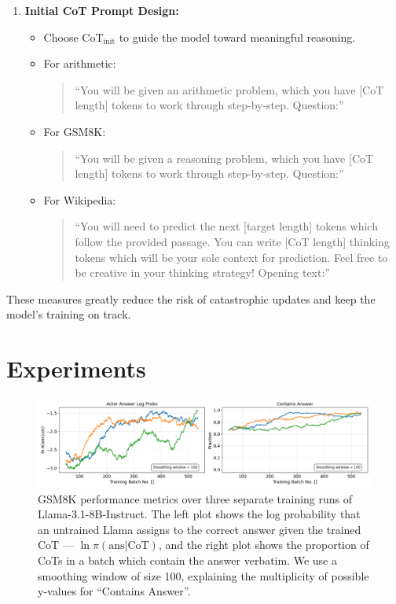 \documentclass{article}
\begin{document}
\begin{enumerate}
    \item \textbf{Initial CoT Prompt Design:} 
    \begin{itemize}
        \item Choose $\text{CoT}_{\text{init}}$ to guide the model toward meaningful reasoning. 
        \item For arithmetic: 
        \begin{quote}
            \small
            ``You will be given an arithmetic problem, which you have [CoT length] tokens to work through step-by-step. Question:''
        \end{quote}
        \item For GSM8K:
        \begin{quote}
            \small
            ``You will be given a reasoning problem, which you have [CoT length] tokens to work through step-by-step. Question:''
        \end{quote}
        \item For Wikipedia:
        \begin{quote}
            \small
            ``You will need to predict the next [target length] tokens which follow the provided passage. You can write [CoT length] thinking tokens which will be your sole context for prediction. Feel free to be creative in your thinking strategy! Opening text:''
        \end{quote}
    \end{itemize}
\end{enumerate}

These measures greatly reduce the risk of catastrophic updates and keep the model's training on track.



\section{Experiments}
\label{sec:experiments}
\begin{figure}
    \centering
    \includegraphics[width=\textwidth]{Figures/llama_combined_metrics_gsm8k.png}
    \caption{GSM8K performance metrics over three separate training runs of Llama-3.1-8B-Instruct. The left plot shows the log probability that an untrained Llama assigns to the correct answer given the trained CoT --- $\ln \pi(\text{ans}|\text{CoT})$, and the right plot shows the proportion of CoTs in a batch which contain the answer verbatim. We use a smoothing window of size 100, explaining the multiplicity of possible y-values for ``Contains Answer''.}
    \label{fig:gsm8k_performance}
\end{figure}
\end{document}
